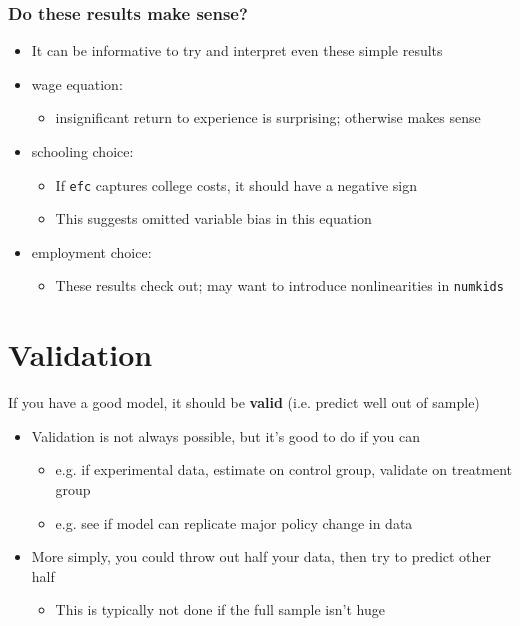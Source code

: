 \documentclass[11pt]{article}
\begin{document}
\subsubsection{Do these results make sense?}
\label{sec:org19c5cb0}

\begin{itemize}
\item It can be informative to try and interpret even these simple results

\item wage equation:
\begin{itemize}
\item insignificant return to experience is surprising; otherwise makes sense
\end{itemize}
\item schooling choice:
\begin{itemize}
\item If \texttt{efc} captures college costs, it should have a negative sign
\item This suggests omitted variable bias in this equation
\end{itemize}
\item employment choice:
\begin{itemize}
\item These results check out; may want to introduce nonlinearities in \texttt{numkids}
\end{itemize}
\end{itemize}

\section{Validation}
\label{sec:org69c06db}

If you have a good model, it should be \textbf{valid} (i.e. predict well out of sample)

\begin{itemize}
\item Validation is not always possible, but it's good to do if you can

\begin{itemize}
\item e.g. if experimental data, estimate on control group, validate on treatment group
\item e.g. see if model can replicate major policy change in data
\end{itemize}

\item More simply, you could throw out half your data, then try to predict other half
\begin{itemize}
\item This is typically not done if the full sample isn't huge
\end{itemize}
\end{itemize}
\end{document}
